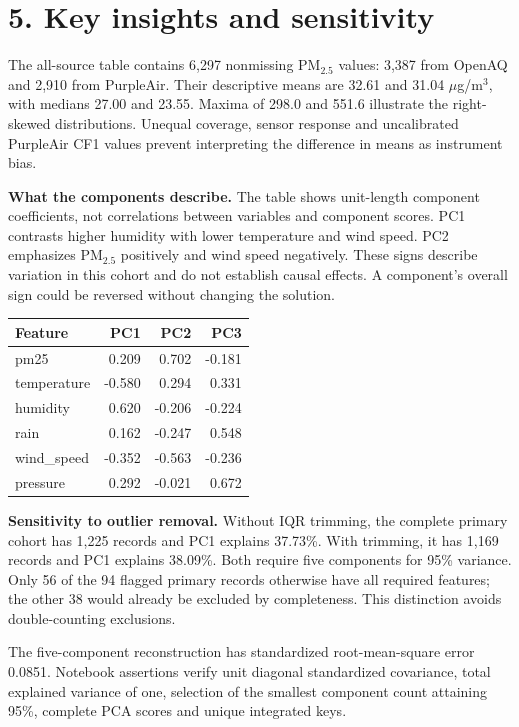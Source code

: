 \documentclass[11pt,a4paper]{article}
\begin{document}
\newpage
\section*{5. Key insights and sensitivity}
The all-source table contains 6,297 nonmissing PM$_{2.5}$ values: 3,387 from OpenAQ and 2,910 from PurpleAir. Their descriptive means are 32.61 and 31.04 $\mu$g/m$^3$, with medians 27.00 and 23.55. Maxima of 298.0 and 551.6 illustrate the right-skewed distributions. Unequal coverage, sensor response and uncalibrated PurpleAir CF1 values prevent interpreting the difference in means as instrument bias.

\textbf{What the components describe.} The table shows unit-length component coefficients, not correlations between variables and component scores. PC1 contrasts higher humidity with lower temperature and wind speed. PC2 emphasizes PM$_{2.5}$ positively and wind speed negatively. These signs describe variation in this cohort and do not establish causal effects. A component's overall sign could be reversed without changing the solution.

\begin{center}\begin{tabular}{lrrr}\toprule
Feature & PC1 & PC2 & PC3 \\\midrule
pm25 & 0.209 & 0.702 & -0.181 \\
temperature & -0.580 & 0.294 & 0.331 \\
humidity & 0.620 & -0.206 & -0.224 \\
rain & 0.162 & -0.247 & 0.548 \\
wind\_speed & -0.352 & -0.563 & -0.236 \\
pressure & 0.292 & -0.021 & 0.672 \\
\bottomrule\end{tabular}\end{center}

\textbf{Sensitivity to outlier removal.} Without IQR trimming, the complete primary cohort has 1,225 records and PC1 explains 37.73\%. With trimming, it has 1,169 records and PC1 explains 38.09\%. Both require five components for 95\% variance. Only 56 of the 94 flagged primary records otherwise have all required features; the other 38 would already be excluded by completeness. This distinction avoids double-counting exclusions.

The five-component reconstruction has standardized root-mean-square error 0.0851. Notebook assertions verify unit diagonal standardized covariance, total explained variance of one, selection of the smallest component count attaining 95\%, complete PCA scores and unique integrated keys.
\end{document}
